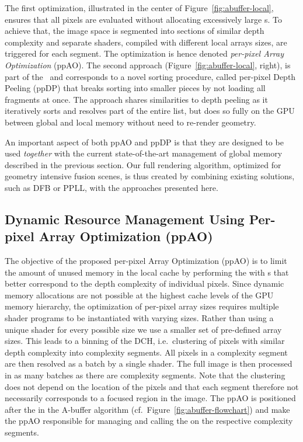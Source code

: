 \documentclass{egpubl}
\newcommand{\ab}{\mbox{A-buffer}}
\newcommand{\dch}{DCH}
\newcommand{\stencil}{ppAO}
\newcommand{\dloop}{ppDP}
\begin{document}
The first optimization, illustrated in the center of Figure~\ref{fig:abuffer-local}, ensures that all pixels are evaluated without allocating excessively large \bArray{}s. 
To achieve that, the image space is segmented into sections of similar depth complexity and separate shaders, compiled with different local arrays sizes, are triggered for each segment. 
The optimization is hence denoted \emph{per-pixel Array Optimization} (\stencil). 
The second approach (Figure~\ref{fig:abuffer-local}, right), is part of the \sResolve\ and corresponds to a novel sorting procedure, called per-pixel Depth Peeling (\dloop) that breaks sorting into smaller pieces by not loading all fragments at once. 
The approach shares similarities to depth peeling as it iteratively sorts and resolves part of the entire list, but does so fully on the GPU between global and local memory without need to re-render geometry. 

An important aspect of both \stencil{} and \dloop{} is that they are designed to be used \emph{together} with the current state-of-the-art management of global memory described in the previous section. 
Our full rendering algorithm, optimized for geometry intensive fusion scenes, is thus created by combining existing solutions, such as DFB or PPLL, with the approaches presented here. 


\subsection{Dynamic Resource Management Using Per-pixel Array Optimization (\stencil)}
\label{sec:ppao}

The objective of the proposed per-pixel Array Optimization (\stencil{}) is to limit the amount of unused memory in the local cache by performing the \sResolve{} with \bArray{}s that better correspond to the depth complexity of individual pixels. 
Since dynamic memory allocations are not possible at the highest cache levels of the GPU memory hierarchy, the optimization of per-pixel array sizes requires multiple shader programs to be instantiated with varying \bArray{} sizes.
Rather than using a unique shader for every possible \bArray{} size we use a smaller set of pre-defined array sizes. 
This leads to a binning of the \dch{}, i.e.\ clustering of pixels with similar depth complexity into complexity segments. 
All pixels in a complexity segment are then resolved as a batch by a single shader. 
The full image is then processed in as many batches as there are complexity segments. 
Note that the clustering does not depend on the location of the pixels and that each segment therefore not necessarily corresponds to a focused region in the image. 
The \stencil{} is positioned after the \sFill{} in the \ab{} algorithm (cf.~Figure~\ref{fig:abuffer-flowchart}) and make the \stencil{} responsible for managing and calling the \sResolve{} on the respective complexity segments.
\end{document}
